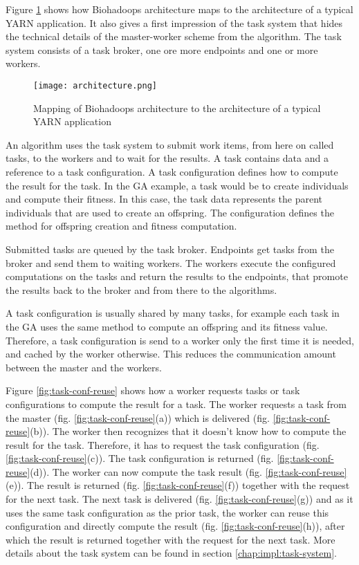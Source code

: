 Figure \ref{fig:architecture} shows how Biohadoops architecture maps to the architecture of a typical YARN application. It also gives a first impression of the task system that hides the technical details of the master-worker scheme from the algorithm. The task system consists of a task broker, one ore more endpoints and one or more workers.

\begin{figure}
  \centering
  \texttt{[image: architecture.png]}
  \caption[Mapping of Biohadoops architecture to YARN]{Mapping of Biohadoops architecture to the architecture of a typical YARN application}
  \label{fig:architecture}
\end{figure}

An algorithm uses the task system to submit work items, from here on called tasks, to the workers and to wait for the results. A task contains data and a reference to a task configuration. A task configuration defines how to compute the result for the task. In the GA example, a task would be to create individuals and compute their fitness. In this case, the task data represents the parent individuals that are used to create an offspring. The configuration defines the method for offspring creation and fitness computation.

Submitted tasks are queued by the task broker. Endpoints get tasks from the broker and send them to waiting workers. The workers execute the configured computations on the tasks and return the results to the endpoints, that promote the results back to the broker and from there to the algorithms.

A task configuration is usually shared by many tasks, for example each task in the GA uses the same method to compute an offspring and its fitness value. Therefore, a task configuration is send to a worker only the first time it is needed, and cached by the worker otherwise. This reduces the communication amount between the master and the workers.

Figure \ref{fig:task-conf-reuse} shows how a worker requests tasks or task configurations to compute the result for a task. The worker requests a task from the master (fig. \ref{fig:task-conf-reuse}(a)) which is delivered (fig. \ref{fig:task-conf-reuse}(b)). The worker then recognizes that it doesn't know how to compute the result for the task. Therefore, it has to request the task configuration (fig. \ref{fig:task-conf-reuse}(c)). The task configuration is returned (fig. \ref{fig:task-conf-reuse}(d)). The worker can now compute the task result (fig. \ref{fig:task-conf-reuse}(e)). The result is returned (fig. \ref{fig:task-conf-reuse}(f)) together with the request for the next task. The next task is delivered (fig. \ref{fig:task-conf-reuse}(g)) and as it uses the same task configuration as the prior task, the worker can reuse this configuration and directly compute the result (fig. \ref{fig:task-conf-reuse}(h)), after which the result is returned together with the request for the next task. More details about the task system can be found in section \ref{chap:impl:task-system}.

